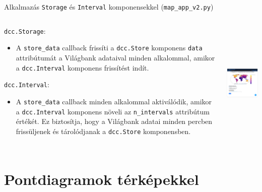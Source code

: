 \documentclass[english, aspectratio=169]{beamer}
\makeatletter
\let\origtableofcontents=\tableofcontents
\def\tableofcontents{\@ifnextchar[{\origtableofcontents}{\gobbletableofcontents}}
\def\gobbletableofcontents#1{\origtableofcontents}
\makeatother
\begin{document}
\begin{frame}{Alkalmazás \texttt{Storage} és \texttt{Interval} komponensekkel (\texttt{map\_app\_v2.py})}
	\begin{columns}
		\begin{column}{.6\textwidth}
			\texttt{dcc.Storage}:
			\begin{itemize}
				\item A \texttt{store\_data} callback frissíti a \texttt{dcc.Store} komponens \texttt{data} attribútumát a Világbank adataival minden alkalommal, amikor a \texttt{dcc.Interval} komponens frissítést indít.
			\end{itemize}
			\texttt{dcc.Interval}:
			\begin{itemize}
				\item A \texttt{store\_data} callback minden alkalommal aktiválódik, amikor a \texttt{dcc.Interval} komponens növeli az \texttt{n\_intervals} attribútum értékét. Ez biztosítja, hogy a Világbank adatai minden percben frissüljenek és tárolódjanak a \texttt{dcc.Store} komponensben.
			\end{itemize}
		\end{column}
		\begin{column}{.4\textwidth}
			\begin{center}
				\includegraphics[width=6cm, height=6cm, keepaspectratio]{images/scatter_24.png}
			\end{center}
		\end{column}
	\end{columns}
\end{frame}

\section{Pontdiagramok térképekkel}

\begin{frame}{}
	\tableofcontents[currentsection]
\end{frame}
\end{document}
